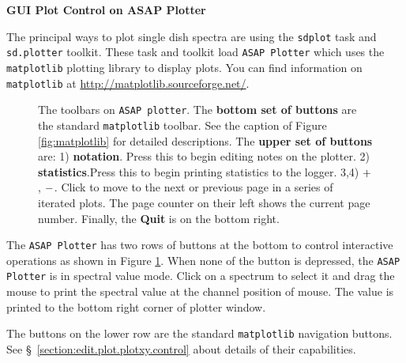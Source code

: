 



\bigskip
{\bf GUI Plot Control on ASAP Plotter}

The principal ways to plot single dish spectra are using 
the {\tt sdplot} task and {\tt sd.plotter} toolkit. 
These task and toolkit load {\tt ASAP Plotter} which uses 
the {\tt matplotlib} plotting library to display plots. 
You can find information on {\tt matplotlib} at
\url{http://matplotlib.sourceforge.net/}.

\begin{figure}[h!]
\begin{center}
\caption{\label{fig:sdplot_toolbar}
  The toolbars on {\tt ASAP plotter}.
  The {\bf bottom set of buttons} are the standard {\tt matplotlib} toolbar. 
  See the caption of Figure \ref{fig:matplotlib} for detailed descriptions.
  The {\bf upper set of buttons} are:
  1) {\bf notation}. Press this to begin editing notes on the plotter. 
  2) {\bf statistics}.Press this to begin printing statistics to the logger.
  3,4) $ {\bf +} $, $ {\bf -} $. Click to move to the next or previous page in a series 
  of iterated plots. The page counter on their left shows the current page 
  number. Finally, the {\bf Quit} is on the bottom right.}
\hrulefill
\end{center}
\end{figure}

The {\tt ASAP Plotter} has two rows of buttons at the bottom to 
control interactive operations as shown in Figure \ref{fig:sdplot_toolbar}. 
When none of the button is depressed, the {\tt ASAP Plotter} is in spectral 
value mode. Click on a spectrum to select it and drag the mouse to print 
the spectral value at the channel position of mouse. The value is printed 
to the bottom right corner of plotter window.

The buttons on the lower row are the standard 
{\tt matplotlib} navigation buttons. 
See \S~\ref{section:edit.plot.plotxy.control} about details of their 
capabilities.


